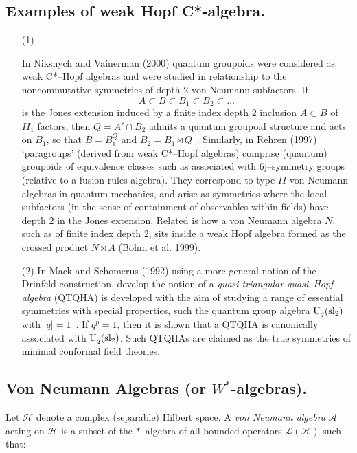 \documentclass[12pt]{article}
\theoremstyle{plain}
\theoremstyle{definition}
\numberwithin{equation}{section}
\newcommand{\U}{{\rm U}}
\newcommand{\A}{\mathcal A}
\renewcommand{\H}{\mathcal H}
\renewcommand{\cL}{\mathcal L}
\newcommand{\med}{\medbreak}
\begin{document}
\subsection{Examples of weak Hopf C*-algebra.}
\begin{itemize}

\item[(1)]

In Nikshych and Vainerman (2000) quantum groupoids were considered as weak
C*--Hopf algebras and were studied in relationship to the
noncommutative symmetries of depth 2 von Neumann subfactors. If
\begin{equation}
A \subset B \subset B_1 \subset B_2 \subset \ldots
\end{equation}
is the Jones extension induced by a finite index depth $2$
inclusion $A \subset B$ of $II_1$ factors, then $Q= A' \cap B_2$
admits a quantum groupoid structure and acts on $B_1$, so that $B
= B_1^{Q}$ and $B_2 = B_1 \rtimes Q$~. Similarly, in Rehren (1997)
`paragroups' (derived from weak C*--Hopf algebras) comprise
(quantum) groupoids of equivalence classes such as associated with
6j--symmetry groups (relative to a fusion rules algebra). They
correspond to type $II$ von Neumann algebras in quantum mechanics,
and arise as symmetries where the local subfactors (in the sense
of containment of observables within fields) have depth $2$ in the
Jones extension. Related is how a von Neumann algebra $N$, such as
of finite index depth $2$, sits inside a weak Hopf algebra formed as
the crossed product $N \rtimes A$ (B\"ohm et al. 1999).

\med
\item[(2)]
In Mack and Schomerus (1992) using a more general notion of the
Drinfeld construction, develop the notion of a \emph{quasi
triangular quasi--Hopf algebra} (QTQHA) is developed with the aim
of studying a range of essential symmetries with special
properties, such the quantum group algebra $\U_q (\rm{sl}_2)$ with
$\vert q \vert =1$~. If $q^p=1$, then it is shown that a QTQHA is
canonically associated with $\U_q (\rm{sl}_2)$. Such QTQHAs are
claimed as the true symmetries of minimal conformal field
theories.
\end{itemize}


\subsection {Von Neumann Algebras (or $W^*$-algebras).}

Let $\H$ denote a complex (separable) Hilbert space. A \emph{von
Neumann algebra} $\A$ acting on $\H$ is a subset of the $*$--algebra of
all bounded operators $\cL(\H)$ such that:
\end{document}
